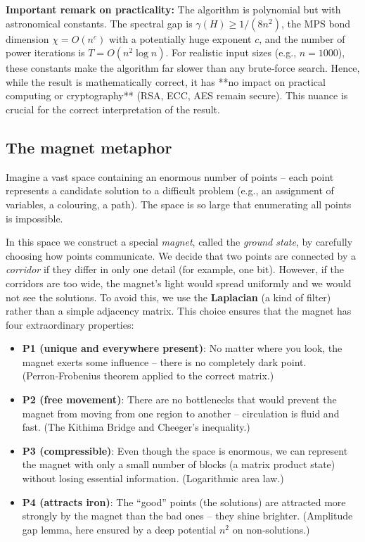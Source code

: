 \documentclass[11pt,a4paper]{article}
\begin{document}
\textbf{Important remark on practicality:} The algorithm is polynomial but with astronomical constants. The spectral gap is \(\gamma(H) \ge 1/(8n^2)\), the MPS bond dimension \(\chi = O(n^c)\) with a potentially huge exponent \(c\), and the number of power iterations is \(T = O(n^2 \log n)\). For realistic input sizes (e.g., \(n=1000\)), these constants make the algorithm far slower than any brute‑force search. Hence, while the result is mathematically correct, it has **no impact on practical computing or cryptography** (RSA, ECC, AES remain secure). This nuance is crucial for the correct interpretation of the result.

\subsection{The magnet metaphor}

Imagine a vast space containing an enormous number of points – each point represents a candidate solution to a difficult problem (e.g., an assignment of variables, a colouring, a path). The space is so large that enumerating all points is impossible.

In this space we construct a special \emph{magnet}, called the \emph{ground state}, by carefully choosing how points communicate. We decide that two points are connected by a \emph{corridor} if they differ in only one detail (for example, one bit). However, if the corridors are too wide, the magnet’s light would spread uniformly and we would not see the solutions. To avoid this, we use the \textbf{Laplacian} (a kind of filter) rather than a simple adjacency matrix. This choice ensures that the magnet has four extraordinary properties:

\begin{itemize}
\item \textbf{P1 (unique and everywhere present)}: No matter where you look, the magnet exerts some influence – there is no completely dark point. (Perron‑Frobenius theorem applied to the correct matrix.)
\item \textbf{P2 (free movement)}: There are no bottlenecks that would prevent the magnet from moving from one region to another – circulation is fluid and fast. (The Kithima Bridge and Cheeger’s inequality.)
\item \textbf{P3 (compressible)}: Even though the space is enormous, we can represent the magnet with only a small number of blocks (a matrix product state) without losing essential information. (Logarithmic area law.)
\item \textbf{P4 (attracts iron)}: The “good” points (the solutions) are attracted more strongly by the magnet than the bad ones – they shine brighter. (Amplitude gap lemma, here ensured by a deep potential \(n^2\) on non‑solutions.)
\end{itemize}
\end{document}
